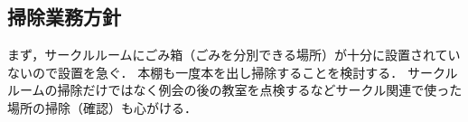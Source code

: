 \subsection*{掃除業務方針}


まず，サークルルームにごみ箱（ごみを分別できる場所）が十分に設置されていないので設置を急ぐ．
本棚も一度本を出し掃除することを検討する．
サークルルームの掃除だけではなく例会の後の教室を点検するなどサークル関連で使った場所の掃除（確認）も心がける．
